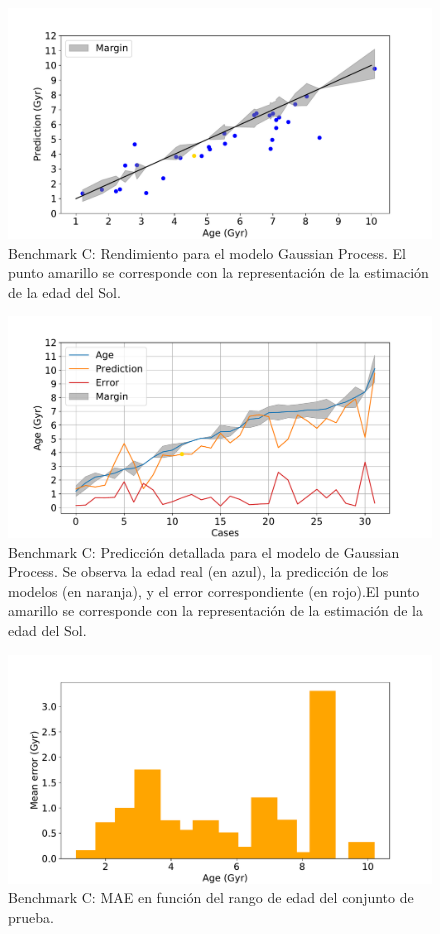\begin{figure}[H]
\begin{center}
 \includegraphics[width=0.8\linewidth]{Figuras/Experimentos/B_C_gp_1.pdf}
\end{center}
\caption{Benchmark C: Rendimiento para el modelo Gaussian Process. El punto amarillo se corresponde con la representación de la estimación de la edad del Sol.}
 \label{fig:benchC_best_1}
\end{figure}

\begin{figure}[H]
\begin{center}
 \includegraphics[width=0.8\linewidth]{Figuras/Experimentos/B_C_gp_2.pdf}
\end{center}
\caption{Benchmark C: Predicción detallada para el modelo de Gaussian Process. Se observa la edad real (en azul), la predicción de los modelos (en naranja), y el error correspondiente (en rojo).El punto amarillo se corresponde con la representación de la estimación de la edad del Sol.}
 \label{fig:benchC_best_2}
\end{figure}

\begin{figure}[H]
\begin{center}
 \includegraphics[width=0.8\linewidth]{Figuras/Experimentos/B_C_gp_3.pdf}
\end{center}
\caption{Benchmark C: MAE en función del rango de edad del conjunto de prueba.}
 \label{fig:benchC_best_3}
\end{figure}


